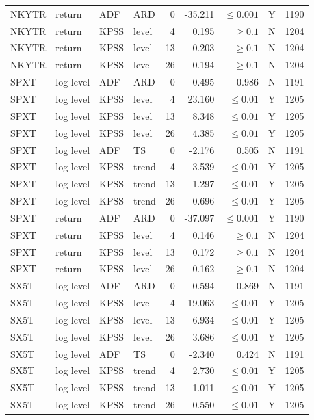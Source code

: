 {\begin{longtable}{@{}llllrrrrr@{}}
NKYTR & return & ADF & ARD & 0 & -35.211 & $\leq 0.001$ & Y & 1190\\
NKYTR & return & KPSS & level & 4 & 0.195 & $\geq 0.1$ & N & 1204\\
NKYTR & return & KPSS & level & 13 & 0.203 & $\geq 0.1$ & N & 1204\\
NKYTR & return & KPSS & level & 26 & 0.194 & $\geq 0.1$ & N & 1204\\
SPXT & log level & ADF & ARD & 0 & 0.495 & 0.986 & N & 1191\\
SPXT & log level & KPSS & level & 4 & 23.160 & $\leq 0.01$ & Y & 1205\\
SPXT & log level & KPSS & level & 13 & 8.348 & $\leq 0.01$ & Y & 1205\\
SPXT & log level & KPSS & level & 26 & 4.385 & $\leq 0.01$ & Y & 1205\\
SPXT & log level & ADF & TS & 0 & -2.176 & 0.505 & N & 1191\\
SPXT & log level & KPSS & trend & 4 & 3.539 & $\leq 0.01$ & Y & 1205\\
SPXT & log level & KPSS & trend & 13 & 1.297 & $\leq 0.01$ & Y & 1205\\
SPXT & log level & KPSS & trend & 26 & 0.696 & $\leq 0.01$ & Y & 1205\\
SPXT & return & ADF & ARD & 0 & -37.097 & $\leq 0.001$ & Y & 1190\\
SPXT & return & KPSS & level & 4 & 0.146 & $\geq 0.1$ & N & 1204\\
SPXT & return & KPSS & level & 13 & 0.172 & $\geq 0.1$ & N & 1204\\
SPXT & return & KPSS & level & 26 & 0.162 & $\geq 0.1$ & N & 1204\\
SX5T & log level & ADF & ARD & 0 & -0.594 & 0.869 & N & 1191\\
SX5T & log level & KPSS & level & 4 & 19.063 & $\leq 0.01$ & Y & 1205\\
SX5T & log level & KPSS & level & 13 & 6.934 & $\leq 0.01$ & Y & 1205\\
SX5T & log level & KPSS & level & 26 & 3.686 & $\leq 0.01$ & Y & 1205\\
SX5T & log level & ADF & TS & 0 & -2.340 & 0.424 & N & 1191\\
SX5T & log level & KPSS & trend & 4 & 2.730 & $\leq 0.01$ & Y & 1205\\
SX5T & log level & KPSS & trend & 13 & 1.011 & $\leq 0.01$ & Y & 1205\\
SX5T & log level & KPSS & trend & 26 & 0.550 & $\leq 0.01$ & Y & 1205\\

\end{longtable}}
